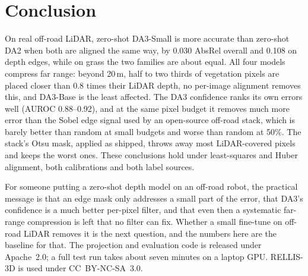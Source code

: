 \documentclass[conference]{IEEEtran}
\newcommand{\absrel}{AbsRel}
\begin{document}
\section{Conclusion}
On real off-road LiDAR, zero-shot DA3-Small is more accurate than zero-shot DA2 when both are aligned the same way, by 0.030 \absrel{} overall and 0.108 on depth edges, while on grass the two families are about equal. All four models compress far range: beyond 20\,m, half to two thirds of vegetation pixels are placed closer than 0.8 times their LiDAR depth, no per-image alignment removes this, and DA3-Base is the least affected. The DA3 confidence ranks its own errors well (AUROC 0.88--0.92), and at the same pixel budget it removes much more error than the Sobel edge signal used by an open-source off-road stack, which is barely better than random at small budgets and worse than random at 50\%. The stack's Otsu mask, applied as shipped, throws away most LiDAR-covered pixels and keeps the worst ones. These conclusions hold under least-squares and Huber alignment, both calibrations and both label sources.

For someone putting a zero-shot depth model on an off-road robot, the practical message is that an edge mask only addresses a small part of the error, that DA3's confidence is a much better per-pixel filter, and that even then a systematic far-range compression is left that no filter can fix. Whether a small fine-tune on off-road LiDAR removes it is the next question, and the numbers here are the baseline for that. The projection and evaluation code is released under Apache~2.0; a full test run takes about seven minutes on a laptop GPU. RELLIS-3D is used under CC~BY-NC-SA~3.0.
\end{document}
